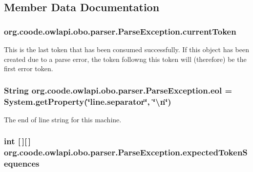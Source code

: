 \subsection{Member Data Documentation}
\hypertarget{classorg_1_1coode_1_1owlapi_1_1obo_1_1parser_1_1_parse_exception_add3559d1841b498d3221cb05da884ca1}{
\subsubsection[{current\-Token}]{ org.\-coode.\-owlapi.\-obo.\-parser.\-Parse\-Exception.\-current\-Token}}\label{classorg_1_1coode_1_1owlapi_1_1obo_1_1parser_1_1_parse_exception_add3559d1841b498d3221cb05da884ca1}
This is the last token that has been consumed successfully. If this object has been created due to a parse error, the token followng this token will (therefore) be the first error token. \hypertarget{classorg_1_1coode_1_1owlapi_1_1obo_1_1parser_1_1_parse_exception_ae7be4170044ff0f5a235ff7794fcadfd}{
\subsubsection[{eol}]{\setlength{\rightskip}{0pt plus 5cm}String org.\-coode.\-owlapi.\-obo.\-parser.\-Parse\-Exception.\-eol = System.\-get\-Property(\char`\"{}line.\-separator\char`\"{}, \char`\"{}\textbackslash{}n\char`\"{})\hspace{0.3cm}{\ttfamily [protected]}}}\label{classorg_1_1coode_1_1owlapi_1_1obo_1_1parser_1_1_parse_exception_ae7be4170044ff0f5a235ff7794fcadfd}
The end of line string for this machine. \hypertarget{classorg_1_1coode_1_1owlapi_1_1obo_1_1parser_1_1_parse_exception_ae38b20926a6bf23a1f699a71a405b290}{
\subsubsection[{expected\-Token\-Sequences}]{\setlength{\rightskip}{0pt plus 5cm}int \mbox{[}$\,$\mbox{]}\mbox{[}$\,$\mbox{]} org.\-coode.\-owlapi.\-obo.\-parser.\-Parse\-Exception.\-expected\-Token\-Sequences}}\label{classorg_1_1coode_1_1owlapi_1_1obo_1_1parser_1_1_parse_exception_ae38b20926a6bf23a1f699a71a405b290}
